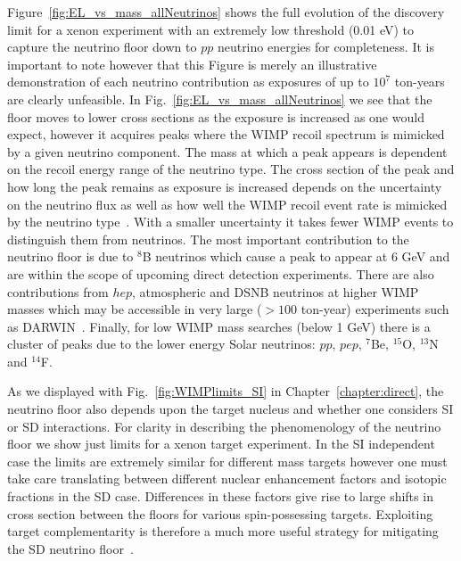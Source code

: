 Figure~\ref{fig:EL_vs_mass_allNeutrinos} shows the full evolution of the discovery limit for a xenon experiment with an extremely low threshold (0.01 eV) to capture the neutrino floor down to $pp$ neutrino energies for completeness. It is important to note however that this Figure is merely an illustrative demonstration of each neutrino contribution as exposures of up to $10^7$ ton-years are clearly unfeasible. In Fig.~\ref{fig:EL_vs_mass_allNeutrinos} we see that the floor moves to lower cross sections as the exposure is increased as one would expect, however it acquires peaks where the WIMP recoil spectrum is mimicked by a given neutrino component. The mass at which a peak appears is dependent on the recoil energy range of the neutrino type. The cross section of the peak and how long the peak remains as exposure is increased depends on the uncertainty on the neutrino flux as well as how well the WIMP recoil event rate is mimicked by the neutrino type~\cite{Ruppin:2014bra}. With a smaller uncertainty it takes fewer WIMP events to distinguish them from neutrinos. The most important contribution to the neutrino floor is due to $^8$B neutrinos which cause a peak to appear at 6 GeV and are within the scope of upcoming direct detection experiments. There are also contributions from $hep$, atmospheric and DSNB neutrinos at higher WIMP masses which may be accessible in very large ($>100$ ton-year) experiments such as DARWIN~\cite{Aalbers:2016jon}. Finally, for low WIMP mass searches (below 1 GeV) there is a cluster of peaks due to the lower energy Solar neutrinos: $pp$, $pep$, $^7$Be, $^{15}$O, $^{13}$N and $^{14}$F.

As we displayed with Fig.~\ref{fig:WIMPlimits_SI} in Chapter~\ref{chapter:direct}, the neutrino floor also depends upon the target nucleus and whether one considers SI or SD interactions. For clarity in describing the phenomenology of the neutrino floor we show just limits for a xenon target experiment. In the SI independent case the limits are extremely similar for different mass targets however one must take care translating between different nuclear enhancement factors and isotopic fractions in the SD case. Differences in these factors give rise to large shifts in cross section between the floors for various spin-possessing targets. Exploiting target complementarity is therefore a much more useful strategy for mitigating the SD neutrino floor~\cite{Ruppin:2014bra}. 

